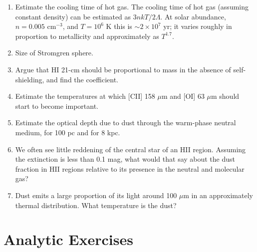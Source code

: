 \begin{enumerate} 
\item Estimate the cooling time of hot gas.
The cooling time of hot gas (assuming constant density) can be
estimated as $3nkT / 2 \Lambda$. At solar abundance, $n=0.005$
cm$^{-3}$, and $T=10^6$ K this is $\sim 2 \times 10^7$ yr; it varies
roughly in proportion to metallicity and approximately as $T^{1.7}$.
\item Size of Stromgren sphere. 
\item Argue that HI 21-cm should be proportional to mass in the
absence of self-shielding, and find the coefficient.
\item Estimate the temperatures at which [CII] 158 $\mu$m and [OI] 63
$\mu$m should start to become important.
\item Estimate the optical depth due to dust through the warm-phase neutral
medium, for 100 pc and for 8 kpc.
\item We often see little reddening of the central star of an HII
region. Assuming the extinction is less than 0.1 mag, what would that
say about the dust fraction in HII regions relative to its presence in
the neutral and molecular gas? 
\item Dust emits a large proportion of its light around 100 $\mu$m in
an approximately thermal distribution. What temperature is the dust?
\end{enumerate}   

\section{Analytic Exercises}

